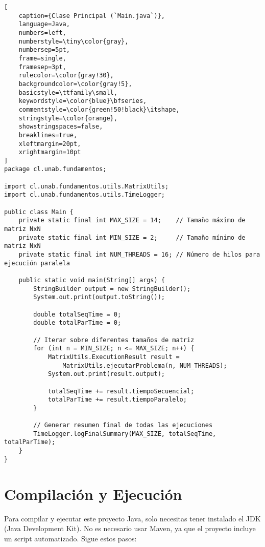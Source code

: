 \documentclass[12pt]{article}
\begin{document}
\begin{lstlisting}[
    caption={Clase Principal (`Main.java`)},
    language=Java,
    numbers=left,
    numberstyle=\tiny\color{gray},
    numbersep=5pt,
    frame=single,
    framesep=3pt,
    rulecolor=\color{gray!30},
    backgroundcolor=\color{gray!5},
    basicstyle=\ttfamily\small,
    keywordstyle=\color{blue}\bfseries,
    commentstyle=\color{green!50!black}\itshape,
    stringstyle=\color{orange},
    showstringspaces=false,
    breaklines=true,
    xleftmargin=20pt,
    xrightmargin=10pt
]
package cl.unab.fundamentos;

import cl.unab.fundamentos.utils.MatrixUtils;
import cl.unab.fundamentos.utils.TimeLogger;

public class Main {
    private static final int MAX_SIZE = 14;    // Tamaño máximo de matriz NxN
    private static final int MIN_SIZE = 2;     // Tamaño mínimo de matriz NxN
    private static final int NUM_THREADS = 16; // Número de hilos para ejecución paralela

    public static void main(String[] args) {
        StringBuilder output = new StringBuilder();
        System.out.print(output.toString());

        double totalSeqTime = 0;
        double totalParTime = 0;

        // Iterar sobre diferentes tamaños de matriz
        for (int n = MIN_SIZE; n <= MAX_SIZE; n++) {
            MatrixUtils.ExecutionResult result = 
                MatrixUtils.ejecutarProblema(n, NUM_THREADS);
            System.out.print(result.output);
            
            totalSeqTime += result.tiempoSecuencial;
            totalParTime += result.tiempoParalelo;
        }

        // Generar resumen final de todas las ejecuciones
        TimeLogger.logFinalSummary(MAX_SIZE, totalSeqTime, totalParTime);
    }
}
\end{lstlisting}

\section*{Compilación y Ejecución}

Para compilar y ejecutar este proyecto Java, solo necesitas tener instalado el JDK (Java Development Kit). No es necesario usar Maven, ya que el proyecto incluye un script automatizado. Sigue estos pasos:
\end{document}
